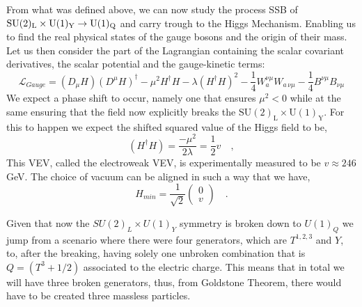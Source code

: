 From what was defined above, we can now study the process SSB of ${\mathrm{SU}(2)_{\mathrm{L}}\times\mathrm{U}(1)_{\mathrm{Y}} \rightarrow \mathrm{U}(1)_{\mathrm{Q}}}$ and carry trough to the Higgs Mechanism. Enabling us to find the real physical states of the gauge bosons and the origin of their mass. Let us then consider the part of the Lagrangian containing the scalar covariant derivatives, the scalar potential and the gauge-kinetic terms:
%
\begin{equation}
\mathcal{L}_{Gauge} = (D_\mu H)(D^\mu H)^\dagger - \mu^2 H^\dagger H - \lambda (H^\dagger H)^2 - \frac{1}{4}  W^{\nu \mu}_a W_{a \,\nu \mu}  
- \frac{1}{4}  B^{\nu \mu} B_{\nu \mu}
\label{eq:GaugeSM}
\end{equation} 
% 
We expect a phase shift to occur, namely one that ensures $\mu^2 < 0$ while at the same ensuring that the field now explicitly breaks the $\mathrm{SU(2)_L \times U(1)_Y}$. For this to happen we expect the shifted squared value of the Higgs field to be,
%
\begin{equation}
(H^\dagger H) = \frac{-\mu^2}{2\lambda} = \frac{1}{2} v  \quad , 
\end{equation} 
This VEV, called the electroweak VEV, is experimentally measured to be $v \approx 246$ GeV. 
%
The choice of vacuum can be aligned in such a way that we have,
\begin{equation}
H_{min} = \frac{1}{\sqrt{2}} \begin{pmatrix} 0 \\
v 
\end{pmatrix} \quad .
\end{equation}

Given that now the $SU(2)_L \times U(1)_Y$ symmetry is broken down to $U(1)_Q$ we jump from a scenario where there were four generators, which are $T^{1,2,3}$ and $Y$, to, after the breaking, having solely one unbroken combination that is $Q =  (T^3 + 1/2)$ associated to the electric charge. This means that in total we will have three broken generators, thus, from Goldstone Theorem, there would have to be created three massless particles. 

